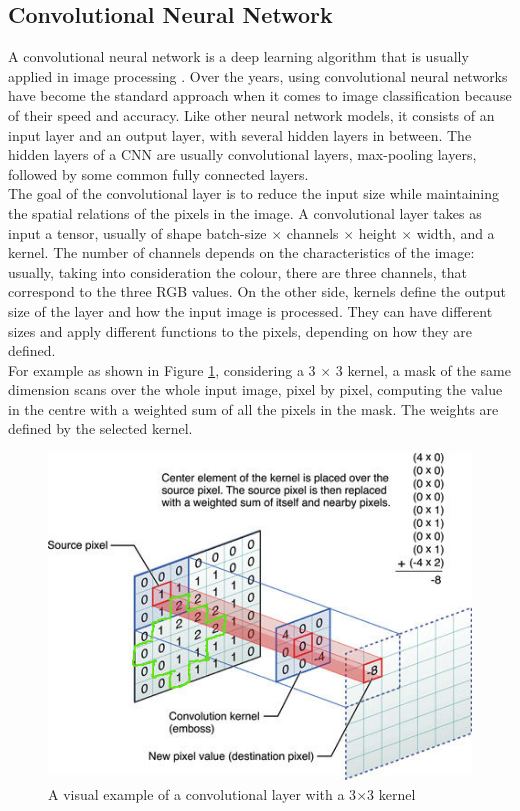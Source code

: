 \documentclass{usiinftr}
\begin{document}
\subsection{Convolutional Neural Network} 
A convolutional neural network is a deep learning algorithm that is usually applied in image processing \cite{13}.
Over the years, using convolutional neural networks have become the standard approach when it comes to image classification because of their speed and accuracy.
Like other neural network models, it consists of an input layer and an output layer, with several hidden layers in between.
The hidden layers of a CNN are usually convolutional layers, max-pooling layers, followed by some common fully connected layers.\\
The goal of the convolutional layer is to reduce the input size while maintaining the spatial relations of the pixels in the image. A convolutional layer takes as input a tensor, usually of shape batch-size $\times$ channels $\times$ height $\times$ width, and a kernel. The number of channels depends on the characteristics of the image: usually, taking into consideration the colour, there are three channels, that correspond to the three RGB values. 
On the other side, kernels define the output size of the layer and how the input image is processed. They can have different sizes and apply different functions to the pixels, depending on how they are defined.  \\
For example as shown in Figure \ref{fig:13}, considering a 3 $\times$ 3 kernel, a mask of the same dimension scans over the whole input image, pixel by pixel, computing the value in the centre with a weighted sum of all the pixels in the mask. The weights are defined by the selected kernel.

\begin{figure}[H]
	\centering
	\includegraphics[width=0.5\linewidth]{img/kernel}
	\caption{A visual example of a convolutional layer with a 3$\times$3 kernel \cite{14}}
	\label{fig:13}
\end{figure}
\end{document}
